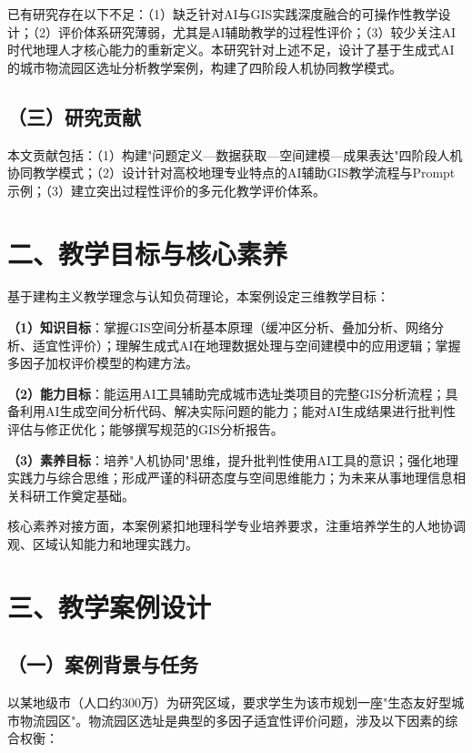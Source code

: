 \documentclass[12pt, a4paper]{article}
\begin{document}
已有研究存在以下不足：（1）缺乏针对AI与GIS实践深度融合的可操作性教学设计；（2）评价体系研究薄弱，尤其是AI辅助教学的过程性评价；（3）较少关注AI时代地理人才核心能力的重新定义。本研究针对上述不足，设计了基于生成式AI的城市物流园区选址分析教学案例，构建了四阶段人机协同教学模式。

\subsection{（三）研究贡献}

本文贡献包括：（1）构建"问题定义—数据获取—空间建模—成果表达"四阶段人机协同教学模式；（2）设计针对高校地理专业特点的AI辅助GIS教学流程与Prompt示例；（3）建立突出过程性评价的多元化教学评价体系。

\newpage

\section{二、教学目标与核心素养}

基于建构主义教学理念与认知负荷理论\citep{李家清2015}，本案例设定三维教学目标：

\textbf{（1）知识目标}：掌握GIS空间分析基本原理（缓冲区分析、叠加分析、网络分析、适宜性评价）；理解生成式AI在地理数据处理与空间建模中的应用逻辑；掌握多因子加权评价模型的构建方法。

\textbf{（2）能力目标}：能运用AI工具辅助完成城市选址类项目的完整GIS分析流程；具备利用AI生成空间分析代码、解决实际问题的能力；能对AI生成结果进行批判性评估与修正优化；能够撰写规范的GIS分析报告。

\textbf{（3）素养目标}：培养"人机协同"思维，提升批判性使用AI工具的意识；强化地理实践力与综合思维；形成严谨的科研态度与空间思维能力；为未来从事地理信息相关科研工作奠定基础。

核心素养对接方面，本案例紧扣地理科学专业培养要求，注重培养学生的人地协调观、区域认知能力和地理实践力\citep{教育部2022}。

\newpage

\section{三、教学案例设计}

\subsection{（一）案例背景与任务}

以某地级市（人口约300万）为研究区域，要求学生为该市规划一座"生态友好型城市物流园区"。物流园区选址是典型的多因子适宜性评价问题，涉及以下因素的综合权衡：
\end{document}
